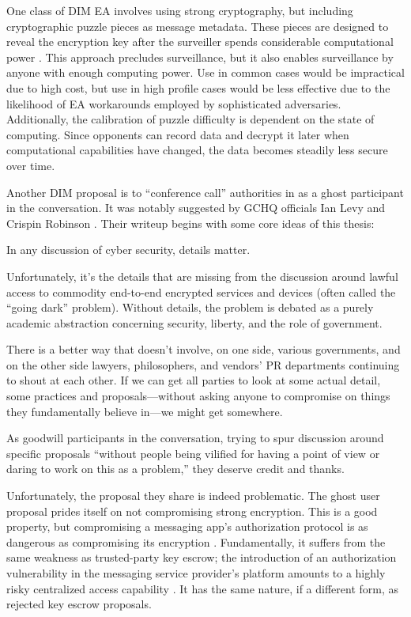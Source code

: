 One class of \ac{DIM} \ac{EA} involves using strong cryptography, but including cryptographic puzzle pieces as message
metadata. These pieces are designed to reveal the encryption key after the surveiller spends considerable computational
power \cite{bellare_translucent_1996} \cite{wright_crypto_2018}. This approach precludes  surveillance, but it
also enables  surveillance by anyone with enough computing power. Use in common cases would be impractical
due to high cost, but use in high profile cases would be less effective due to the likelihood of \ac{EA} workarounds
employed by sophisticated adversaries. Additionally, the calibration of puzzle difficulty is dependent on the state of
computing. Since opponents can record data and decrypt it later when computational capabilities have changed, the data
becomes steadily less secure over time.

Another \ac{DIM} proposal is to ``conference call'' authorities in as a ghost participant in the conversation. It was
notably suggested by \ac{GCHQ} officials Ian Levy and Crispin Robinson \cite{levy_robinson_2018}. Their writeup begins
with some core ideas of this thesis:

\begin{displayquote}
In any discussion of cyber security, details matter.

Unfortunately, it's the details that are missing from the discussion around lawful access to commodity end-to-end
encrypted services and devices (often called the ``going dark'' problem). Without details, the problem is debated as a
purely academic abstraction concerning security, liberty, and the role of government.

There is a better way that doesn’t involve, on one side, various governments, and on the other side lawyers,
philosophers, and vendors' PR departments continuing to shout at each other. If we can get all parties to look at some
actual detail, some practices and proposals---without asking anyone to compromise on things they fundamentally believe
in---we might get somewhere.
\cite{levy_robinson_2018}
\end{displayquote}

As goodwill participants in the conversation, trying to spur discussion around specific proposals ``without people being
vilified for having a point of view or daring to work on this as a problem,'' they deserve credit and thanks.

Unfortunately, the proposal they share is indeed problematic. The ghost user proposal prides itself on not compromising
strong encryption. This is a good property, but compromising a messaging app's authorization protocol is as dangerous as
compromising its encryption \cite{callas_1_2019}. Fundamentally, it suffers from the same weakness as trusted-party key
escrow; the introduction of an authorization vulnerability in the messaging service provider's platform amounts to a
highly risky centralized access capability \cite{schneier_ghost_2019}. It has the same nature, if a different form, as
rejected key escrow proposals.

